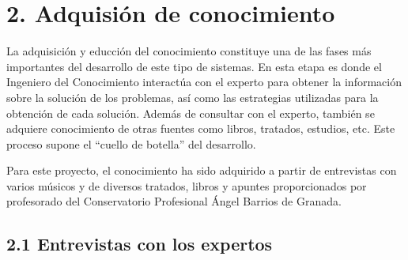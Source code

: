 \chapter*{2. Adquisión de conocimiento}

La adquisición y educción del conocimiento constituye una de las fases más importantes del desarrollo de este tipo de sistemas. En esta etapa es donde el Ingeniero del Conocimiento interactúa con el experto para obtener la información sobre la solución de los problemas, así como las estrategias utilizadas para la obtención de cada solución. Además de consultar con el experto, también se adquiere conocimiento de otras fuentes como libros, tratados, estudios, etc. Este proceso supone el ``cuello de botella'' del desarrollo.

Para este proyecto, el conocimiento ha sido adquirido a partir de entrevistas con varios músicos y de diversos tratados, libros y apuntes proporcionados por profesorado del Conservatorio Profesional Ángel Barrios de Granada.

\section*{2.1 Entrevistas con los expertos}


